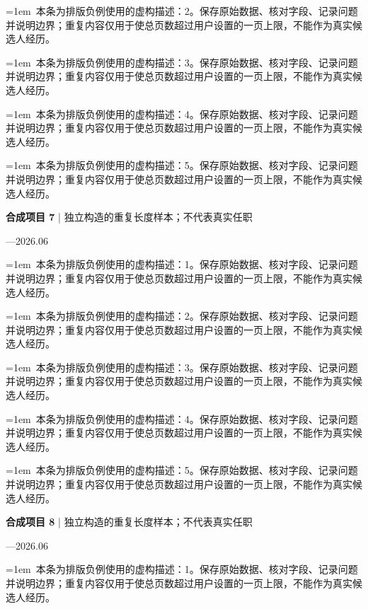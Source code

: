 \documentclass[11pt,a4paper,fontset=fandol]{ctexart}
\begin{document}
\noindent\hangindent=1em\textbullet\ 本条为排版负例使用的虚构描述：2。保存原始数据、核对字段、记录问题并说明边界；重复内容仅用于使总页数超过用户设置的一页上限，不能作为真实候选人经历。\par
\noindent\hangindent=1em\textbullet\ 本条为排版负例使用的虚构描述：3。保存原始数据、核对字段、记录问题并说明边界；重复内容仅用于使总页数超过用户设置的一页上限，不能作为真实候选人经历。\par
\noindent\hangindent=1em\textbullet\ 本条为排版负例使用的虚构描述：4。保存原始数据、核对字段、记录问题并说明边界；重复内容仅用于使总页数超过用户设置的一页上限，不能作为真实候选人经历。\par
\noindent\hangindent=1em\textbullet\ 本条为排版负例使用的虚构描述：5。保存原始数据、核对字段、记录问题并说明边界；重复内容仅用于使总页数超过用户设置的一页上限，不能作为真实候选人经历。\par
\begin{minipage}{\linewidth}
\textbf{合成项目 7} | 独立构造的重复长度样本；不代表真实任职\par
{\small{}—2026.06\par}
\noindent\hangindent=1em\textbullet\ 本条为排版负例使用的虚构描述：1。保存原始数据、核对字段、记录问题并说明边界；重复内容仅用于使总页数超过用户设置的一页上限，不能作为真实候选人经历。\par
\end{minipage}\par
\noindent\hangindent=1em\textbullet\ 本条为排版负例使用的虚构描述：2。保存原始数据、核对字段、记录问题并说明边界；重复内容仅用于使总页数超过用户设置的一页上限，不能作为真实候选人经历。\par
\noindent\hangindent=1em\textbullet\ 本条为排版负例使用的虚构描述：3。保存原始数据、核对字段、记录问题并说明边界；重复内容仅用于使总页数超过用户设置的一页上限，不能作为真实候选人经历。\par
\noindent\hangindent=1em\textbullet\ 本条为排版负例使用的虚构描述：4。保存原始数据、核对字段、记录问题并说明边界；重复内容仅用于使总页数超过用户设置的一页上限，不能作为真实候选人经历。\par
\noindent\hangindent=1em\textbullet\ 本条为排版负例使用的虚构描述：5。保存原始数据、核对字段、记录问题并说明边界；重复内容仅用于使总页数超过用户设置的一页上限，不能作为真实候选人经历。\par
\begin{minipage}{\linewidth}
\textbf{合成项目 8} | 独立构造的重复长度样本；不代表真实任职\par
{\small{}—2026.06\par}
\noindent\hangindent=1em\textbullet\ 本条为排版负例使用的虚构描述：1。保存原始数据、核对字段、记录问题并说明边界；重复内容仅用于使总页数超过用户设置的一页上限，不能作为真实候选人经历。\par
\end{minipage}\par
\end{document}
